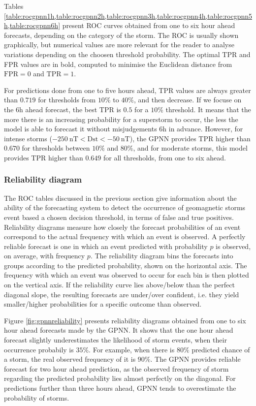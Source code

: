 Tables \cref{table:rocgpnn1h,table:rocgpnn2h,table:rocgpnn3h,table:rocgpnn4h,table:rocgpnn5h,table:rocgpnn6h} 
present ROC curves obtained from one to six hour ahead forecasts, depending on the category of the storm. 
The ROC is usually shown graphically, but numerical values are more relevant for the reader to analyse 
variations depending on the choosen threshold probability. The optimal TPR and FPR values are in bold, computed to 
minimise the Euclidean distance from $\text{FPR} = 0$ and $\text{TPR} = 1$.

For predictions done from one to five hours ahead, TPR values are always greater than $0.719$ for thresholds from 
$10\%$  to $40\%$, and then decrease. If we focuse on the 6h ahead forecast, the best TPR is $0.5$ 
for a $10\%$ threshold. It means that the more there is an increasing probability for a superstorm to occur, 
the less the model is able to forecast it without misjudgements 6h in advance. However, for intense storms 
($\SI{-250}{\nano\tesla} < \mathrm{Dst} < \SI{-50}{\nano\tesla}$), the GPNN provides TPR higher than $0.670$ 
for thresholds between $10\%$ and $80\%$, and for moderate storms, this model provides TPR higher than $0.649$ for all 
thresholds, from one to six ahead. 


\subsubsection{Reliability diagram}


The ROC tables discussed in the previous section give information about the ability of the forecasting system to 
detect the occurrence of geomagnetic storms event based a chosen decision threshold, in terms of false and true positives. 
Reliability diagrams measure how closely the forecast probabilities of an event correspond to the actual 
frequency with which an event is observed. A perfectly reliable forecast is one in which an event predicted 
with probability $p$ is observed, on average, with frequency $p$. The reliability diagram bins the forecasts into 
groups according to the predicted probability, shown on the horizontal axis. The frequency with which an event was 
observed to occur for each bin is then plotted on the vertical axis. If the reliability curve lies above/below 
than the perfect diagonal slope, the resulting forecasts are under/over confident, i.e. they yield  
smaller/higher probabilities for a specific outcome than observed. 

Figure \ref{fig:gpnnreliability} presents reliability diagrams obtained from one to six hour ahead forecasts made 
by the GPNN. It shows that the one hour ahead forecast slightly underestimates the likelihood of storm events, when their 
occurrence probabily is $35\%$. For example, when there is $80\%$ predicted chance of a storm, 
the real observed frequency of it is $90\%$. The GPNN provides reliable forecast for two hour ahead prediction, 
as the observed frequency of storm regarding the predicted probability lies almost perfectly on the diagonal. 
For predictions further than three hours ahead, GPNN tends to overestimate the probability of storms. 

